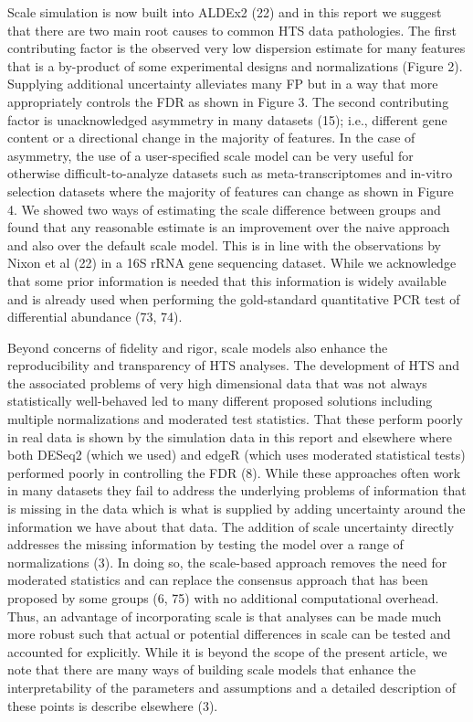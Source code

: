\documentclass[
]{article}
\begin{document}
Scale simulation is now built into ALDEx2 (22) and in this report we
suggest that there are two main root causes to common HTS data
pathologies. The first contributing factor is the observed very low
dispersion estimate for many features that is a by-product of some
experimental designs and normalizations (Figure 2). Supplying additional
uncertainty alleviates many FP but in a way that more appropriately
controls the FDR as shown in Figure 3. The second contributing factor is
unacknowledged asymmetry in many datasets (15); i.e., different gene
content or a directional change in the majority of features. In the case
of asymmetry, the use of a user-specified scale model can be very useful
for otherwise difficult-to-analyze datasets such as meta-transcriptomes
and in-vitro selection datasets where the majority of features can
change as shown in Figure 4. We showed two ways of estimating the scale
difference between groups and found that any reasonable estimate is an
improvement over the naive approach and also over the default scale
model. This is in line with the observations by Nixon et al (22) in a
16S rRNA gene sequencing dataset. While we acknowledge that some prior
information is needed that this information is widely available and is
already used when performing the gold-standard quantitative PCR test of
differential abundance (73, 74).

Beyond concerns of fidelity and rigor, scale models also enhance the
reproducibility and transparency of HTS analyses. The development of HTS
and the associated problems of very high dimensional data that was not
always statistically well-behaved led to many different proposed
solutions including multiple normalizations and moderated test
statistics. That these perform poorly in real data is shown by the
simulation data in this report and elsewhere where both DESeq2 (which we
used) and edgeR (which uses moderated statistical tests) performed
poorly in controlling the FDR (8). While these approaches often work in
many datasets they fail to address the underlying problems of
information that is missing in the data which is what is supplied by
adding uncertainty around the information we have about that data. The
addition of scale uncertainty directly addresses the missing information
by testing the model over a range of normalizations (3). In doing so,
the scale-based approach removes the need for moderated statistics and
can replace the consensus approach that has been proposed by some groups
(6, 75) with no additional computational overhead. Thus, an advantage of
incorporating scale is that analyses can be made much more robust such
that actual or potential differences in scale can be tested and
accounted for explicitly. While it is beyond the scope of the present
article, we note that there are many ways of building scale models that
enhance the interpretability of the parameters and assumptions and a
detailed description of these points is describe elsewhere (3).
\end{document}
